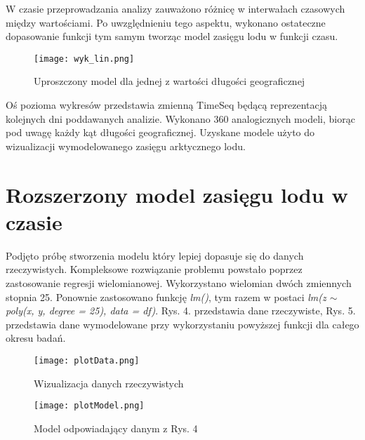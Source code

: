 \documentclass[letterpaper,12pt]{article}
\begin{document}
\noindent W czasie przeprowadzania analizy zauważono różnicę w interwałach czasowych między wartościami. Po uwzględnieniu tego aspektu, wykonano ostateczne dopasowanie funkcji tym samym tworząc model zasięgu lodu w funkcji czasu.
\newline

\begin{figure}[H]
        \centering \texttt{[image: wyk\_lin.png]}
        \caption{
                \label{fig:samplesetup}
                Uproszczony model dla jednej z wartości długości geograficznej
        }
\end{figure}

\noindent Oś pozioma wykresów przedstawia zmienną TimeSeq będącą reprezentacją kolejnych dni poddawanych analizie. Wykonano 360 analogicznych modeli, biorąc pod uwagę każdy kąt długości geograficznej. Uzyskane modele użyto do wizualizacji wymodelowanego zasięgu arktycznego lodu.

\section{Rozszerzony model zasięgu lodu w czasie}

Podjęto próbę stworzenia modelu który lepiej dopasuje się do danych rzeczywistych. Kompleksowe rozwiązanie problemu powstało poprzez zastosowanie regresji wielomianowej. Wykorzystano wielomian dwóch zmiennych stopnia 25. Ponownie zastosowano funkcję \textit{lm()}, tym razem w postaci \textit{lm(z $\sim$ poly(x, y, degree = 25), data = df)}. Rys. 4. przedstawia dane rzeczywiste, Rys. 5. przedstawia dane wymodelowane przy wykorzystaniu powyższej funkcji dla całego okresu badań.


\begin{figure}[ht]
        \centering \texttt{[image: plotData.png]}
        \caption{
                \label{fig:samplesetup}
                Wizualizacja danych rzeczywistych
        }
\end{figure}

\newpage

\begin{figure}[h]
        \centering \texttt{[image: plotModel.png]}
        \caption{
                \label{fig:samplesetup}
                Model odpowiadający danym z Rys. 4
        }
\end{figure}
\end{document}
